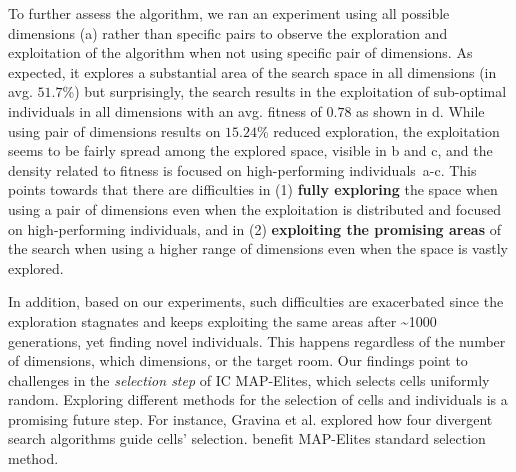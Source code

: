 To further assess the algorithm, we ran an experiment using all possible dimensions (a) rather than specific pairs to observe the exploration and exploitation of the algorithm when not using specific pair of dimensions. As expected, it explores a substantial area of the search space in all dimensions (in avg. $51.7$\%) but surprisingly, the search results in the exploitation of sub-optimal individuals in all dimensions with an avg. fitness of $0.78$ as shown in d. While using pair of dimensions results on $15.24$\% reduced exploration, the exploitation seems to be fairly spread among the explored space, visible in b and c, and the density related to fitness is focused on high-performing individuals~a-c. This points towards that there are difficulties in (1) \textbf{fully exploring} the space when using a pair of dimensions even when the exploitation is distributed and focused on high-performing individuals, and in (2) \textbf{exploiting the promising areas} of the search when using a higher range of dimensions even when the space is vastly explored. 

In addition, based on our experiments, such difficulties are exacerbated since the exploration stagnates and keeps exploiting the same areas after \~{}1000 generations, yet finding novel individuals. This happens regardless of the number of dimensions, which dimensions, or the target room. Our findings point to challenges in the \emph{selection step} of IC MAP-Elites, which selects cells uniformly random. Exploring different methods for the selection of cells and individuals is a promising future step. For instance, Gravina et al.  explored how four divergent search algorithms guide cells' selection.
benefit MAP-Elites standard selection method.


